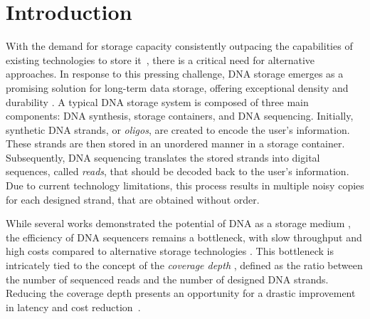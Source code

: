 \documentclass[11pt,a4paper,reqno,twoside]{amsart}
\theoremstyle{definition}
\begin{document}
\section{Introduction}
With the demand for storage capacity consistently outpacing the capabilities of existing technologies to store it~\cite{rydning2022worldwide}, there is a critical need for alternative approaches. In response to this pressing challenge, DNA storage emerges as a promising solution for long-term data storage, offering exceptional density and durability \cite{alliance2021preserving, markowitz2023biology}. A typical DNA storage system is composed of three main components: DNA synthesis, storage containers, and DNA sequencing. Initially, synthetic DNA strands, or \emph{oligos}, are created to encode the user's information. These strands are then stored in an unordered manner in a storage container. Subsequently, DNA sequencing translates the stored strands into digital sequences, called \emph{reads}, that should be decoded back to the user's information. Due to current technology limitations, this process results in multiple noisy copies for each designed strand, that are obtained without order.

While several works demonstrated the potential of DNA as a storage medium \cite{anavy2019data,blawat2016forward,bornholt2016dna, organick2018random, yazdi2017portable, tabatabaei2015rewritable, bar2021deep}, the efficiency of DNA sequencers remains a bottleneck, with slow throughput and high costs compared to alternative storage technologies \cite{shomorony2022information, yazdi2015dna, alliance2021preserving}. This bottleneck is intricately tied to the concept of the \emph{coverage depth} \cite{heckel2019characterization}, defined as the ratio between the number of sequenced reads and the number of designed DNA strands. Reducing the coverage depth presents an opportunity for a  drastic improvement in latency and cost reduction~\cite{erlich2017dna, chandak2019improved, bar2023cover, preuss2024sequencing}. 
\end{document}
